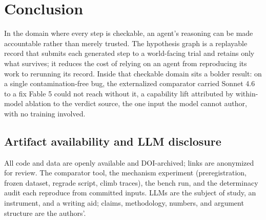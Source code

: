 \documentclass[sigconf,review,anonymous]{acmart}
\begin{document}
\section{Conclusion}\label{sec:conclusion}

In the domain where every step is checkable, an agent's reasoning can be made accountable rather than merely trusted. The hypothesis graph is a replayable record that submits each generated step to a world-facing trial and retains only what survives; it reduces the cost of relying on an agent from reproducing its work to rerunning its record. Inside that checkable domain sits a bolder result: on a single contamination-free bug, the externalized comparator carried Sonnet 4.6 to a fix Fable 5 could not reach without it, a capability lift attributed by within-model ablation to the verdict source, the one input the model cannot author, with no training involved.

\subsection*{Artifact availability and LLM disclosure}
All code and data are openly available and DOI-archived; links are anonymized for review. The comparator tool, the mechanism experiment (preregistration, frozen dataset, regrade script, climb traces), the bench run, and the determinacy audit each reproduce from committed inputs. LLMs are the subject of study, an instrument, and a writing aid; claims, methodology, numbers, and argument structure are the authors'.
\end{document}
